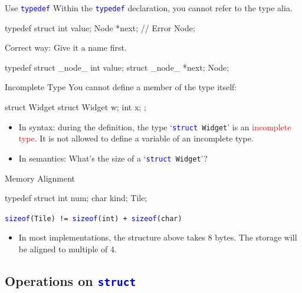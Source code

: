 \documentclass{beamer}
\newcommand{\red}[1]{\textcolor{red}{#1}}
\newcommand{\blue}[1]{\textcolor{blue}{#1}}
\newcommand{\ttt}[1]{\texttt{#1}}
\newcommand{\bluett}[1]{\blue{\ttt{#1}}}
\theoremstyle{definition}
\begin{document}
\begin{frame}[fragile]{Use \bluett{typedef}}
    Within the \bluett{typedef} declaration, you cannot refer to the type alia.
    \begin{cpp}
typedef struct {
  int value;
  Node *next;   // Error
} Node;
    \end{cpp}
    \pause
    Correct way: Give it a name first.
    \begin{cpp}
typedef struct _node_ {
  int value;
  struct _node_ *next;
} Node;
    \end{cpp}
\end{frame}

\begin{frame}[fragile]{Incomplete Type}
    You cannot define a member of the type itself:
    \begin{cpp}
struct Widget {
  struct Widget w;
  int x;
};
    \end{cpp}
    \begin{itemize}
        \item In syntax: during the definition, the type `\bluett{struct }\ttt{Widget}' is an \red{incomplete type}. It is not allowed to define a variable of an incomplete type.
        \item In semantics: What's the size of a `\bluett{struct }\ttt{Widget}'?
    \end{itemize}
\end{frame}

\begin{frame}[fragile]{Memory Alignment}
    \begin{cpp}
typedef struct {
  int num;
  char kind;
} Tile;
    \end{cpp}
    \bluett{sizeof}\ttt{(Tile) != }\bluett{sizeof}\ttt{(int) + }\bluett{sizeof}\ttt{(char)}
    \begin{itemize}
        \item In most implementations, the structure above takes 8 bytes. The storage will be aligned to multiple of 4.
    \end{itemize}
\end{frame}

\subsection{Operations on \bluett{struct}}
\end{document}
